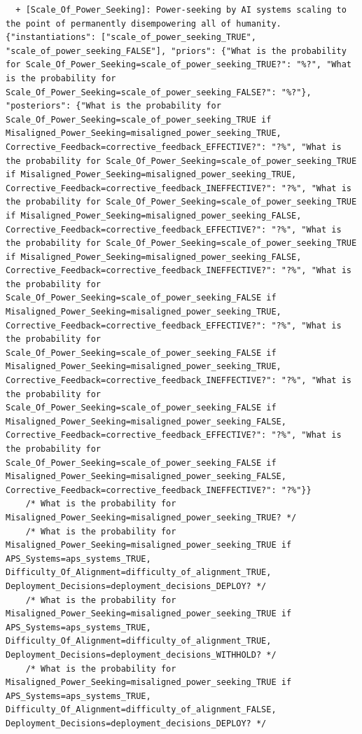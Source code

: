 \documentclass[
  11pt,
  letterpaper,
]{book}
\begin{document}
\begin{landscape}
\begin{verbatim}
  + [Scale_Of_Power_Seeking]: Power-seeking by AI systems scaling to the point of permanently disempowering all of humanity. {"instantiations": ["scale_of_power_seeking_TRUE", "scale_of_power_seeking_FALSE"], "priors": {"What is the probability for Scale_Of_Power_Seeking=scale_of_power_seeking_TRUE?": "%?", "What is the probability for Scale_Of_Power_Seeking=scale_of_power_seeking_FALSE?": "%?"}, "posteriors": {"What is the probability for Scale_Of_Power_Seeking=scale_of_power_seeking_TRUE if Misaligned_Power_Seeking=misaligned_power_seeking_TRUE, Corrective_Feedback=corrective_feedback_EFFECTIVE?": "?%", "What is the probability for Scale_Of_Power_Seeking=scale_of_power_seeking_TRUE if Misaligned_Power_Seeking=misaligned_power_seeking_TRUE, Corrective_Feedback=corrective_feedback_INEFFECTIVE?": "?%", "What is the probability for Scale_Of_Power_Seeking=scale_of_power_seeking_TRUE if Misaligned_Power_Seeking=misaligned_power_seeking_FALSE, Corrective_Feedback=corrective_feedback_EFFECTIVE?": "?%", "What is the probability for Scale_Of_Power_Seeking=scale_of_power_seeking_TRUE if Misaligned_Power_Seeking=misaligned_power_seeking_FALSE, Corrective_Feedback=corrective_feedback_INEFFECTIVE?": "?%", "What is the probability for Scale_Of_Power_Seeking=scale_of_power_seeking_FALSE if Misaligned_Power_Seeking=misaligned_power_seeking_TRUE, Corrective_Feedback=corrective_feedback_EFFECTIVE?": "?%", "What is the probability for Scale_Of_Power_Seeking=scale_of_power_seeking_FALSE if Misaligned_Power_Seeking=misaligned_power_seeking_TRUE, Corrective_Feedback=corrective_feedback_INEFFECTIVE?": "?%", "What is the probability for Scale_Of_Power_Seeking=scale_of_power_seeking_FALSE if Misaligned_Power_Seeking=misaligned_power_seeking_FALSE, Corrective_Feedback=corrective_feedback_EFFECTIVE?": "?%", "What is the probability for Scale_Of_Power_Seeking=scale_of_power_seeking_FALSE if Misaligned_Power_Seeking=misaligned_power_seeking_FALSE, Corrective_Feedback=corrective_feedback_INEFFECTIVE?": "?%"}}
    /* What is the probability for Misaligned_Power_Seeking=misaligned_power_seeking_TRUE? */
    /* What is the probability for Misaligned_Power_Seeking=misaligned_power_seeking_TRUE if APS_Systems=aps_systems_TRUE, Difficulty_Of_Alignment=difficulty_of_alignment_TRUE, Deployment_Decisions=deployment_decisions_DEPLOY? */
    /* What is the probability for Misaligned_Power_Seeking=misaligned_power_seeking_TRUE if APS_Systems=aps_systems_TRUE, Difficulty_Of_Alignment=difficulty_of_alignment_TRUE, Deployment_Decisions=deployment_decisions_WITHHOLD? */
    /* What is the probability for Misaligned_Power_Seeking=misaligned_power_seeking_TRUE if APS_Systems=aps_systems_TRUE, Difficulty_Of_Alignment=difficulty_of_alignment_FALSE, Deployment_Decisions=deployment_decisions_DEPLOY? */

\end{verbatim}
\end{landscape}
\end{document}
